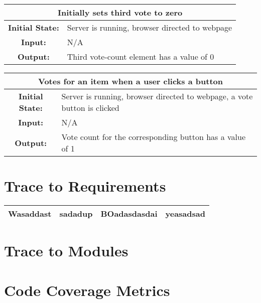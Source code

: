 \documentclass[12pt, titlepage]{article}
\begin{document}
\begin{center}
\begin{table}[H]
\begin{tabularx}{\textwidth}{| c X |}
\hline
\multicolumn{2}{|c|}{\textbf{Initially sets third vote to zero}}\\
\hline
\textbf{Initial State: } & Server is running, browser directed to webpage\\
\textbf{Input: } & N/A\\
\textbf{Output: } & Third vote-count element has a value of 0\\
\hline
\end{tabularx}
\end{table}
\end{center}


\begin{center}
\begin{table}[H]
\begin{tabularx}{\textwidth}{| c X |}
\hline
\multicolumn{2}{|c|}{\textbf{Votes for an item when a user clicks a button}}\\
\hline
\textbf{Initial State: } & Server is running, browser directed to webpage, a vote button is clicked\\
\textbf{Input: } & N/A\\
\textbf{Output: } & Vote count for the corresponding button has a value of 1\\
\hline
\end{tabularx}
\end{table}
\end{center}

\section{Trace to Requirements}
\begin{center}
\begin{tabular}{| c | c | c | c |}
\hline
Wasaddast & sadadup & BOadasdasdai & yeasadsad \\
\hline
\end{tabular}
\end{center}
\section{Trace to Modules}		

\section{Code Coverage Metrics}




\end{document}

